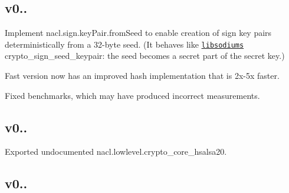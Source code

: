 \subsection*{v0.. }


\begin{DoxyItemize}
\item Implement {\ttfamily nacl.\+sign.\+key\+Pair.\+from\+Seed} to enable creation of sign key pairs deterministically from a 32-\/byte seed. (It behaves like \href{http://doc.libsodium.org/public-key_cryptography/public-key_signatures.html}{\tt libsodium\textquotesingle{}s} {\ttfamily crypto\+\_\+sign\+\_\+seed\+\_\+keypair}\+: the seed becomes a secret part of the secret key.)
\item Fast version now has an improved hash implementation that is 2x-\/5x faster.
\item Fixed benchmarks, which may have produced incorrect measurements.
\end{DoxyItemize}

\subsection*{v0.. }


\begin{DoxyItemize}
\item Exported undocumented {\ttfamily nacl.\+lowlevel.\+crypto\+\_\+core\+\_\+hsalsa20}.
\end{DoxyItemize}

\subsection*{v0.. }


